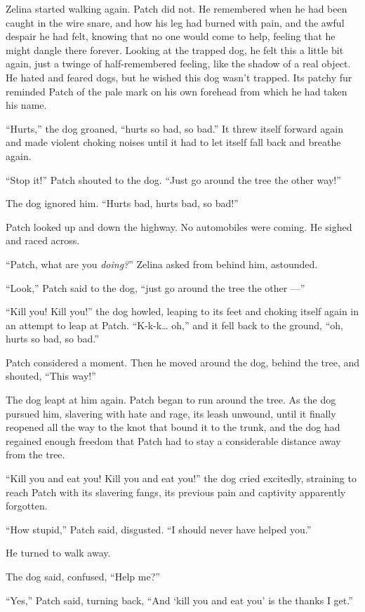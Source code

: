 \documentclass[12pt]{memoir}
\begin{document}
Zelina started walking again. Patch did not. He remembered when he had
been caught in the wire snare, and how his leg had burned with pain,
and the awful despair he had felt, knowing that no one would come to
help, feeling that he might dangle there forever. Looking at the
trapped dog, he felt this a little bit again, just a twinge of
half-remembered feeling, like the shadow of a real object. He hated
and feared dogs, but he wished this dog wasn’t trapped. Its patchy fur
reminded Patch of the pale mark on his own forehead from which he had
taken his name.

“Hurts,” the dog groaned, “hurts so bad, so bad.” It threw itself
forward again and made violent choking noises until it had to let
itself fall back and breathe again.

“Stop it!” Patch shouted to the dog. “Just go around the tree the
other way!”

The dog ignored him. “Hurts bad, hurts bad, so bad!”

Patch looked up and down the highway. No automobiles were coming. He
sighed and raced across.

“Patch, what are you \textit{doing?}” Zelina asked from behind him,
astounded.

“Look,” Patch said to the dog, “just go around the tree the other —”

“Kill you! Kill you!” the dog howled, leaping to its feet and choking
itself again in an attempt to leap at Patch. “K-k-k… oh,” and it fell
back to the ground, “oh, hurts so bad, so bad.”

Patch considered a moment. Then he moved around the dog, behind the
tree, and shouted, “This way!”

The dog leapt at him again. Patch began to run around the tree. As the
dog pursued him, slavering with hate and rage, its leash unwound,
until it finally reopened all the way to the knot that bound it to the
trunk, and the dog had regained enough freedom that Patch had to stay
a considerable distance away from the tree.

“Kill you and eat you! Kill you and eat you!” the dog cried excitedly,
straining to reach Patch with its slavering fangs, its previous pain
and captivity apparently forgotten.

“How stupid,” Patch said, disgusted. “I should never have helped you.”

He turned to walk away.

The dog said, confused, “Help me?”

“Yes,” Patch said, turning back, “And ‘kill you and eat you’ is the
thanks I get.”
\end{document}
